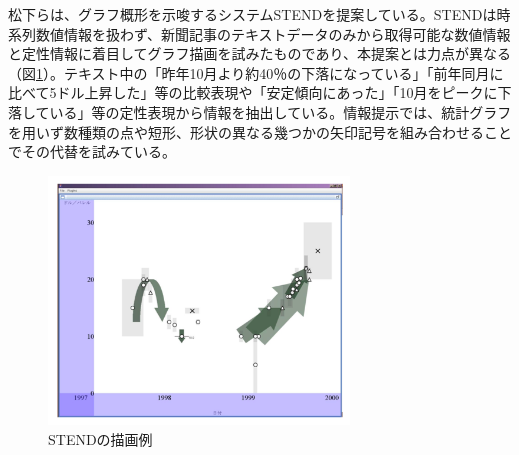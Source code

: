 \documentclass{matsushita-zemi}
\begin{document}
松下らは、グラフ概形を示唆するシステムSTENDを提案している\cite{STEND}。STENDは時系列数値情報を扱わず、新聞記事のテキストデータのみから取得可能な数値情報と定性情報に着目してグラフ描画を試みたものであり、本提案とは力点が異なる（図\ref{STEND}）。テキスト中の「昨年10月より約40％の下落になっている」「前年同月に比べて5ドル上昇した」等の比較表現や「安定傾向にあった」「10月をピークに下落している」等の定性表現から情報を抽出している。情報提示では、統計グラフを用いず数種類の点や短形、形状の異なる幾つかの矢印記号を組み合わせることでその代替を試みている。

\begin{figure}[tb]
  \begin{center}
   \includegraphics[width=8cm,bb=0 0 512 422]{STEND.PNG}
  \end{center}
 \caption{STENDの描画例}
 \label{STEND}
\end{figure}
\end{document}
